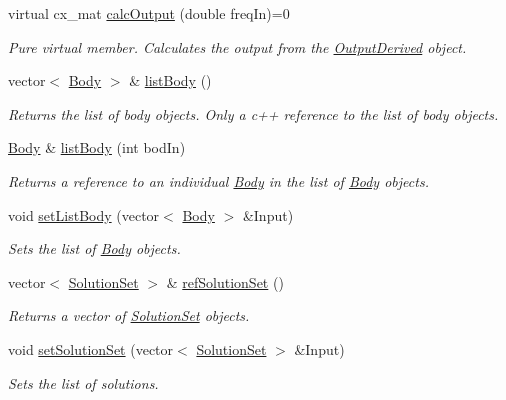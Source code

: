 \begin{DoxyCompactItemize}
virtual cx\-\_\-mat \hyperlink{class_output_derived_a7a65864e45519edfe7fe45c408457f41}{calc\-Output} (double freq\-In)=0
\begin{DoxyCompactList}\small\item\em Pure virtual member. Calculates the output from the \hyperlink{class_output_derived}{Output\-Derived} object. \end{DoxyCompactList}\item 
vector$<$ \hyperlink{class_body}{Body} $>$ \& \hyperlink{class_output_derived_a525d8eb4dbed1fd130614521c5d602c1}{list\-Body} ()
\begin{DoxyCompactList}\small\item\em Returns the list of body objects. Only a c++ reference to the list of body objects. \end{DoxyCompactList}\item 
\hyperlink{class_body}{Body} \& \hyperlink{class_output_derived_abda178375c603cd2d2efcc0c5f9c1f10}{list\-Body} (int bod\-In)
\begin{DoxyCompactList}\small\item\em Returns a reference to an individual \hyperlink{class_body}{Body} in the list of \hyperlink{class_body}{Body} objects. \end{DoxyCompactList}\item 
void \hyperlink{class_output_derived_ac5a137e45b7ff144d9c5d1a9d7e51a24}{set\-List\-Body} (vector$<$ \hyperlink{class_body}{Body} $>$ \&Input)
\begin{DoxyCompactList}\small\item\em Sets the list of \hyperlink{class_body}{Body} objects. \end{DoxyCompactList}\item 
vector$<$ \hyperlink{class_solution_set}{Solution\-Set} $>$ \& \hyperlink{class_output_derived_ae94d577f4f58c2c1f8cb2c9c650d505c}{ref\-Solution\-Set} ()
\begin{DoxyCompactList}\small\item\em Returns a vector of \hyperlink{class_solution_set}{Solution\-Set} objects. \end{DoxyCompactList}\item 
void \hyperlink{class_output_derived_aa61b7866cca2a734af62fd8806bb1bc2}{set\-Solution\-Set} (vector$<$ \hyperlink{class_solution_set}{Solution\-Set} $>$ \&Input)
\begin{DoxyCompactList}\small\item\em Sets the list of solutions. \end{DoxyCompactList}\item 

\end{DoxyCompactItemize}
